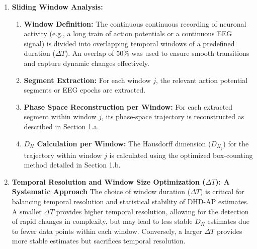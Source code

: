 \documentclass{article}
\begin{document}
\begin{enumerate}
    \item \textbf{Sliding Window Analysis:}
    \begin{enumerate}
        \item \textbf{Window Definition:} The continuous continuous recording of neuronal activity (e.g., a long train of action potentials or a continuous EEG signal) is divided into overlapping temporal windows of a predefined duration ($\Delta T$). An overlap of 50\% was used to ensure smooth transitions and capture dynamic changes effectively.
        \item \textbf{Segment Extraction:} For each window $j$, the relevant action potential segments or EEG epochs are extracted.
        \item \textbf{Phase Space Reconstruction per Window:} For each extracted segment within window $j$, its phase-space trajectory is reconstructed as described in Section 1.a.
        \item \textbf{$D_H$ Calculation per Window:} The Hausdorff dimension ($D_{H_j}$) for the trajectory within window $j$ is calculated using the optimized box-counting method detailed in Section 1.b.
    \end{enumerate}

    \item \textbf{Temporal Resolution and Window Size Optimization ($\Delta T$): A Systematic Approach}
    The choice of window duration ($\Delta T$) is critical for balancing temporal resolution and statistical stability of DHD-AP estimates. A smaller $\Delta T$ provides higher temporal resolution, allowing for the detection of rapid changes in complexity, but may lead to less stable $D_H$ estimates due to fewer data points within each window. Conversely, a larger $\Delta T$ provides more stable estimates but sacrifices temporal resolution.


\end{enumerate}
\end{document}
